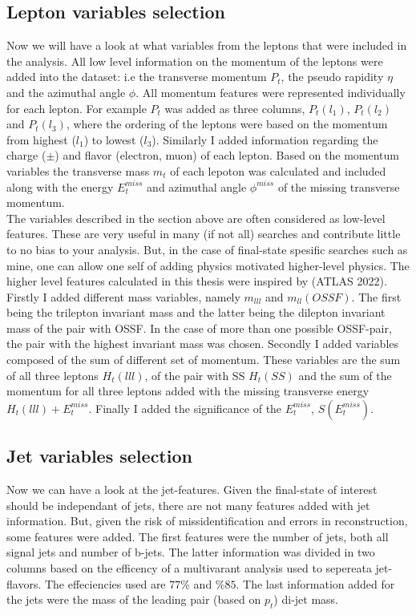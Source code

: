 \subsection{Lepton variables selection}
Now we will have a look at what variables from the leptons that were included in the analysis. All low level information on the
momentum of the leptons were added into the dataset: i.e the transverse momentum $P_t$, the pseudo rapidity $\eta$ and the azimuthal
angle $\phi$. All momentum features were represented individually for each lepton. For example $P_t$ was added as three columns, $P_t(l_1)$,
$P_t(l_2)$ and $P_t(l_3)$, where the ordering of the leptons were based on the momentum from highest ($l_1$) to lowest ($l_3$).
Similarly I added information regarding the charge ($\pm$) and flavor (electron, muon) of each lepton. Based on the momentum variables
the transverse mass $m_t$ of each lepoton was calculated and included along with the energy $E_t^{miss}$ and azimuthal angle $\phi^{miss}$ of
the missing transverse momentum.
\\
The variables described in the section above are often considered as low-level features. These are very useful in many (if not all)
searches and contribute little to no bias to your analysis. But, in the case of final-state spesific searches such as mine,
one can allow one self of adding physics motivated higher-level physics. The higher level features calculated in this thesis
were inspired by \cite{franchini_search_2019} (ATLAS 2022). 
\\
Firstly I added different mass variables, namely $m_{lll}$ and $m_{ll}(OSSF)$. The first being the trilepton invariant mass 
and the latter being the dilepton invariant mass of the pair with \ac{OSSF}. In the case of more than one possible OSSF-pair,
the pair with the highest invariant mass was chosen. Secondly I added variables composed of the sum of different set of momentum.
These variables are the sum of all three leptons $H_t(lll)$, of the pair with \ac{SS} $H_t(SS)$ and the sum of the momentum
for all three leptons added with the missing transverse energy $H_t(lll) + E_t^{miss}$. Finally I added the significance of the
$E_t^{miss}$, $S(E_t^{miss})$.
\subsection{Jet variables selection}
Now we can have a look at the jet-features. Given the final-state of interest should be independant of jets, there are not many
features added with jet information. But, given the risk of missidentification and errors in reconstruction, some features were 
added. The first features were the number of jets, both all signal jets and number of b-jets.
The latter information was divided in two columns based on the efficency of a multivarant analysis used to sepereata jet-flavors.
The effeciencies used are $77\%$ and $\%85$. The last information added for the jets were the mass of the leading pair (based on $p_t$)
di-jet mass.
